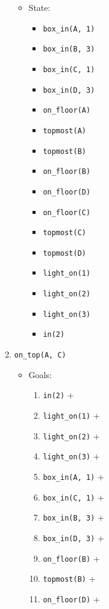 \documentclass[12pt]{article}
\begin{document}
\begin{enumerate}
\begin{itemize}
\begin{enumerate}
        \end{enumerate}
      \item State:
        \begin{itemize}
          \item \texttt{box\_in(A, 1)}
          \item \texttt{box\_in(B, 3)}
          \item \texttt{box\_in(C, 1)}
          \item \texttt{box\_in(D, 3)}
          \item \texttt{on\_floor(A)}
          \item \texttt{topmost(A)}
          \item \texttt{topmost(B)}
          \item \texttt{on\_floor(B)}
          \item \texttt{on\_floor(D)}
          \item \texttt{on\_floor(C)}
          \item \texttt{topmost(C)}
          \item \texttt{topmost(D)}
          \item \texttt{light\_on(1)}
          \item \texttt{light\_on(2)}
          \item \texttt{light\_on(3)}
          \item \texttt{in(2)}
        \end{itemize}
    \end{itemize}
  \item \texttt{on\_top(A, C)}
    \begin{itemize}
      \item Goals:
        \begin{enumerate}
          \item \texttt{in(2)} +
          \item \texttt{light\_on(1)} +
          \item \texttt{light\_on(2)} +
          \item \texttt{light\_on(3)} +
          \item \texttt{box\_in(A, 1)} +
          \item \texttt{box\_in(C, 1)} +
          \item \texttt{box\_in(B, 3)} +
          \item \texttt{box\_in(D, 3)} +
          \item \texttt{on\_floor(B)} +
          \item \texttt{topmost(B)} +
          \item \texttt{on\_floor(D)} +

\end{enumerate}
\end{itemize}
\end{enumerate}
\end{document}
